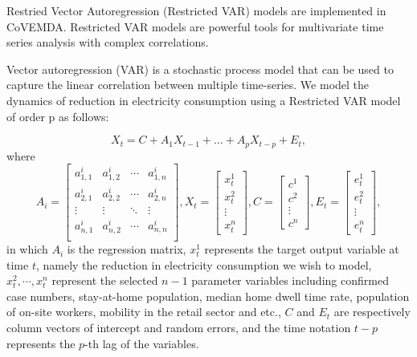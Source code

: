 \documentclass[11pt]{article}
\newcommand{\covemda}{CoVEMDA}
\numberwithin{equation}{section}
\numberwithin{table}{section}
\numberwithin{figure}{section}
\begin{document}
Restried Vector Autoregression (Restricted VAR) models are implemented in \covemda. Restricted VAR models are powerful tools for multivariate time series analysis with complex correlations.

Vector autoregression (VAR)\cite{var} is a stochastic process model that can be used to capture the linear correlation between multiple time-series. We model the dynamics of reduction in electricity consumption using a Restricted VAR model of order p as follows:

\begin{equation}
  X_t=C+A_1X_{t-1}+\dots+A_pX_{t-p}+E_t,
\end{equation}
where
\begin{equation}
  A_i=
  \begin{bmatrix}
  a_{1,1}^i & a_{1,2}^i & \cdots & a_{1,n}^i\\
  a_{2,1}^i & a_{2,2}^i & \cdots & a_{2,n}^i\\
  \vdots & \vdots & \ddots & \vdots \\
  a_{n,1}^i & a_{n,2}^i & \cdots & a_{n,n}^i\\
  \end{bmatrix}
  ,X_t=
  \begin{bmatrix}
    x_t^1\\x_t^2\\\vdots\\x_t^n
  \end{bmatrix},
  C=
  \begin{bmatrix}
    c^1\\c^2\\\vdots\\c^n
  \end{bmatrix},
  E_t=
  \begin{bmatrix}
    e_t^1\\e_t^2\\\vdots\\e_t^n
  \end{bmatrix},
\end{equation}
in which $A_i$ is the regression matrix, $x_t^1$ represents the target output variable at time $t$, namely the reduction in electricity consumption we wish to model, $x_t^2,\cdots,x_t^n$ represent the selected $n-1$ parameter variables including confirmed case numbers, stay-at-home population, median home dwell time rate, population of on-site workers, mobility in the retail sector and etc., $C$ and $E_t$ are respectively column vectors of intercept and random errors, and the time notation $t-p$ represents the $p$-th lag of the variables.
\end{document}
